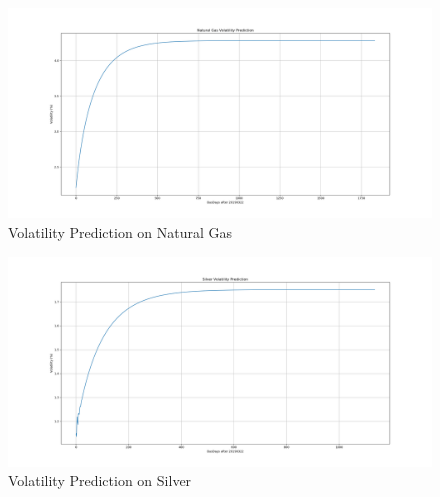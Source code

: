 \documentclass[10pt, a4paper, twocolumn]{article} %
\begin{document}
\begin{figure}[!ht]
	\includegraphics[width=\linewidth]{Naturalgasvol.png} %
	\caption{Volatility Prediction on Natural Gas} %
	\label{gas pred} %
\end{figure}

\begin{figure}[!ht]
	\includegraphics[width=\linewidth]{Silvervol.png} %
	\caption{Volatility Prediction on Silver} %
	\label{silver pred} %
\end{figure}


\clearpage
\end{document}
